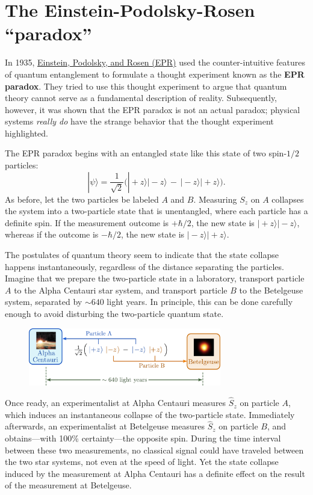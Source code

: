 \documentclass[pra,12pt]{revtex4}
\begin{document}
\section{The Einstein-Podolsky-Rosen ``paradox''}

In 1935, \hyperref[cite:epr]{Einstein, Podolsky, and Rosen (EPR)} used
the counter-intuitive features of quantum entanglement to formulate a
thought experiment known as the \textbf{EPR paradox}.  They tried to
use this thought experiment to argue that quantum theory cannot serve
as a fundamental description of reality.  Subsequently, however, it
was shown that the EPR paradox is not an actual paradox; physical
systems \textit{really do} have the strange behavior that the thought
experiment highlighted.

The EPR paradox begins with an entangled state like this state of two
spin-$1/2$ particles:
\begin{equation}
  |\psi\rangle = \frac{1}{\sqrt{2}} \Big(|\!+\!z\rangle|\!-\!z\rangle \,-\, |\!-\!z\rangle|\!+\!z\rangle\Big).
\end{equation}
As before, let the two particles be labeled $A$ and $B$.  Measuring
$S_z$ on $A$ collapses the system into a two-particle state that is
unentangled, where each particle has a definite spin.  If the
measurement outcome is $+\hbar/2$, the new state is $|\!+\!z\rangle
|\!-\!z\rangle$, whereas if the outcome is $-\hbar/2$, the new state
is $|\!-\!z\rangle|\!+\!z\rangle$.

The postulates of quantum theory seem to indicate that the state
collapse happens instantaneously, regardless of the distance
separating the particles.  Imagine that we prepare the two-particle
state in a laboratory, transport particle $A$ to the Alpha Centauri
star system, and transport particle $B$ to the Betelgeuse system,
separated by $\sim 640$ light years.  In principle, this can be done
carefully enough to avoid disturbing the two-particle quantum state.

\begin{figure}[h]
  \centering\includegraphics[width=0.75\textwidth]{epr}
\end{figure}

Once ready, an experimentalist at Alpha Centauri measures $\hat{S}_z$
on particle $A$, which induces an instantaneous collapse of the
two-particle state.  Immediately afterwards, an experimentalist at
Betelgeuse measures $\hat{S}_z$ on particle $B$, and obtains---with
100\% certainty---the opposite spin.  During the time interval between
these two measurements, no classical signal could have traveled
between the two star systems, not even at the speed of light.  Yet
the state collapse induced by the measurement at Alpha Centauri has a
definite effect on the result of the measurement at Betelgeuse.
\end{document}
